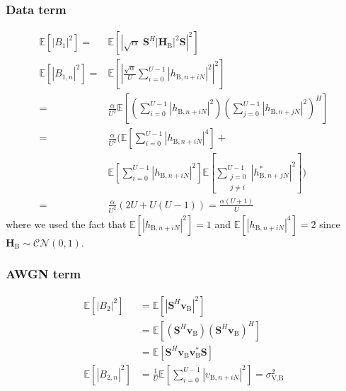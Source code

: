 \documentclass[journal,comsoc]{IEEEtran}
\newcommand{\module}[1]{\left|#1\right|}
\newcommand{\EX}[1]{\mathbb{E} \left[#1\right]}%
\newcommand{\HB}{\textbf{H}_{\text{B}}}
\newcommand{\vb}{\textbf{v}_{\text{B}}}
\newcommand{\spread}{\textbf{S}}
\begin{document}
\subsubsection{Data term}\label{sec:data-term-app}
\begin{equation}
	\begin{split}
		\EX{|B_1|^2} =& \EX{\module{\sqrt{\alpha} \; \spread^H \module{\HB}^2 \spread}^2} \\
		\EX{|B_{1,n}|^2} =&\EX{\left|\frac{\sqrt{\alpha}}{U}\sum_{i=0}^{U-1} \left| h_{\text{B}, n + iN}\right|^2\right|^2}  \\
		=& \frac{\alpha}{U^2} \EX{\left(\sum_{i=0}^{U-1} \left| h_{\text{B}, n + iN}\right|^2\right) \left(\sum_{j=0}^{U-1} \left| h_{\text{B}, n + jN}\right|^2\right)^H}\\
		=&  \frac{\alpha}{U^2} \Big(\EX{\sum_{i=0}^{U-1}\left| h_{\text{B}, n + iN}\right|^4} +\\
		& \EX{\sum_{i=0}^{U-1}\left| h_{\text{B}, n + iN}\right|^2}\EX{\sum_{\substack{j=0 \\ j\neq i}}^{U-1} | h^*_{\text{B}, n + jN}|^2} \Big) \\
		=& \frac{\alpha}{U^2} \left( 2U + U(U-1)\right) = \frac{\alpha (U+1)}{U}
	\end{split}
	\label{eq:appA:data_bob-app}
\end{equation}
where we used the fact that $\EX{\left| h_{\text{B}, n + iN}\right|^2} = 1$ and $\EX{\left| h_{\text{B}, n + iN}\right|^4} = 2$ since $\HB \sim \mathcal{CN}(0,1)$.



\subsubsection{AWGN term}\label{sec:awgn-term-app}
\begin{equation}
	\begin{split}
		\EX{|B_2|^2} &=  \EX{\module{\spread^H \vb}^2} \\
		&= \EX{\left(\spread^H \vb \right)\left(\spread^H \vb \right)^H} \\
		&=\EX{\spread^H \vb \vb^* \spread } \\
		\EX{|B_{2,n}|^2} &= \frac{1}{U} \EX{\sum_{i=0}^{U-1} |v_{\text{B}, n + iN}|^2} = \sigma^2_{\text{V,B}}
	\end{split}
	\label{eq:appA:noise_bob-app}
\end{equation}
\end{document}
